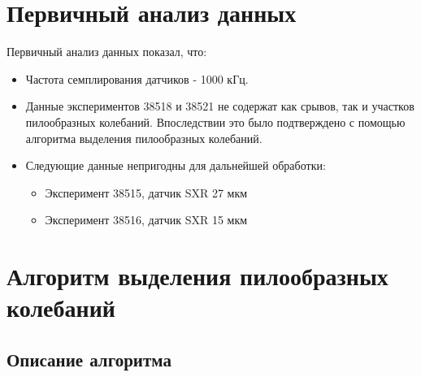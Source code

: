 \documentclass{report}
\begin{document}
\section{Первичный анализ данных}
Первичный анализ данных показал, что:
\begin{itemize}
    \item Частота семплирования датчиков - 1000 кГц.
    \item Данные экспериментов 38518 и 38521 не содержат как срывов, так и участков пилообразных колебаний. Впоследствии это было подтверждено с помощью алгоритма выделения пилообразных колебаний.
    \item Следующие данные непригодны для дальнейшей обработки:
    \begin{itemize}
        \item Эксперимент 38515, датчик SXR 27 мкм
        \item Эксперимент 38516, датчик SXR 15 мкм
    \end{itemize}
\end{itemize}

\newpage

\section{Алгоритм выделения пилообразных колебаний}

\subsection{Описание алгоритма}
\end{document}
